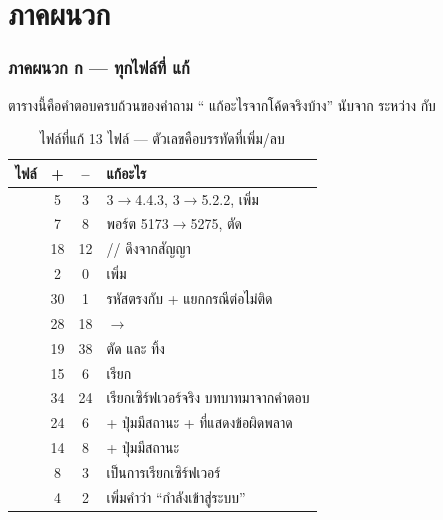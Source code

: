 \part{ภาคผนวก}

\section*{ภาคผนวก ก --- ทุกไฟล์ที่  แก้}

ตารางนี้คือคำตอบครบถ้วนของคำถาม `` แก้อะไรจากโค้ดจริงบ้าง''
นับจาก  ระหว่าง  กับ 

\begin{table}[htbp]
\centering
\footnotesize\sansall
\caption{ไฟล์ที่แก้ 13 ไฟล์ --- ตัวเลขคือบรรทัดที่เพิ่ม/ลบ}
\label{tab:diffmod}
\begin{tabular}{@{}L{4.6cm}ccL{5.6cm}@{}}
\toprule
\textbf{ไฟล์} & \textbf{+} & \textbf{--} & \textbf{แก้อะไร} \\
\midrule
{} & 5 & 3 &  3$\rightarrow$4.4.3,  3$\rightarrow$5.2.2, เพิ่ม  \\
 & 7 & 8 & พอร์ต 5173$\rightarrow$5275, ตัด  \\
 & 18 & 12 & // ดึงจากสัญญา \\
 & 2 & 0 & เพิ่ม  \\
 & 30 & 1 & รหัสตรงกับ  + แยกกรณีต่อไม่ติด \\
 & 28 & 18 &  $\rightarrow$  \\
 & 19 & 38 & ตัด  และ  ทิ้ง \\
 & 15 & 6 & เรียก  \\
 & 34 & 24 & เรียกเซิร์ฟเวอร์จริง บทบาทมาจากคำตอบ \\
 & 24 & 6 &  + ปุ่มมีสถานะ + ที่แสดงข้อผิดพลาด \\
 & 14 & 8 &  + ปุ่มมีสถานะ \\
 & 8 & 3 &  เป็นการเรียกเซิร์ฟเวอร์ \\
 & 4 & 2 & เพิ่มคำว่า ``กำลังเข้าสู่ระบบ'' \\
\bottomrule
\end{tabular}
\end{table}

